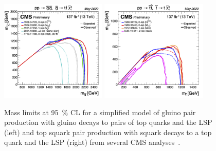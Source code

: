 \begin{figure}
\centering
\includegraphics[width=0.45\textwidth]{figures/intro/gluino_mass_limits.png}
\includegraphics[width=0.45\textwidth]{figures/intro/stop_mass_limits.png}
\caption{Mass limits at \SI{95}{\percent} CL for a simplified model of gluino pair production with gluino decays to pairs of top quarks and the LSP (left) and top squark pair production with squark decays to a top quark and the LSP (right) from several CMS analyses~\cite{cms_susy_public_results}.}
\label{cms_susy_summary}
\end{figure}